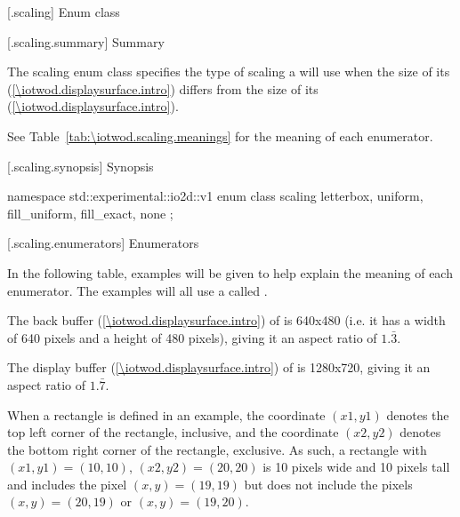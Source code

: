 [\iotwod.scaling] {Enum class }

 [\iotwod.scaling.summary] { Summary}

\pnum
The scaling enum class specifies the type of scaling a  
will use when the size of its  (\ref{\iotwod.displaysurface.intro}) differs from the size of its  (\ref{\iotwod.displaysurface.intro}).

\pnum
See Table~\ref{tab:\iotwod.scaling.meanings} for the meaning of each  enumerator.

 [\iotwod.scaling.synopsis] { Synopsis}

\begin{codeblock}
namespace std::experimental::io2d::v1 {
  enum class scaling {
    letterbox,
    uniform,
    fill_uniform,
    fill_exact,
    none
  };
}
\end{codeblock}

 [\iotwod.scaling.enumerators] { Enumerators}

\pnum
\begin{note}
In the following table, examples will be given to help explain the meaning of each enumerator. The examples will all use a  called .

The back buffer (\ref{\iotwod.displaysurface.intro}) of  is 640x480 (i.e. it has a width of 640 pixels and a height of 480 pixels), giving it an aspect ratio of $1.\bar{3}$.

The display buffer (\ref{\iotwod.displaysurface.intro}) of  is 1280x720, giving it an aspect ratio of $1.\bar{7}$.

When a rectangle is defined in an example, the coordinate $(x1,y1)$ denotes the top left corner of the rectangle, inclusive, and the coordinate $(x2,y2)$ denotes the bottom right corner of the rectangle, exclusive. As such, a rectangle with $(x1,y1) = (10,10)$, $(x2,y2) = (20, 20)$ is 10 pixels wide and 10 pixels tall and includes the pixel $(x,y) = (19,19)$ but does not include the pixels $(x,y) = (20,19)$ or $(x,y) = (19,20)$.
\end{note}


